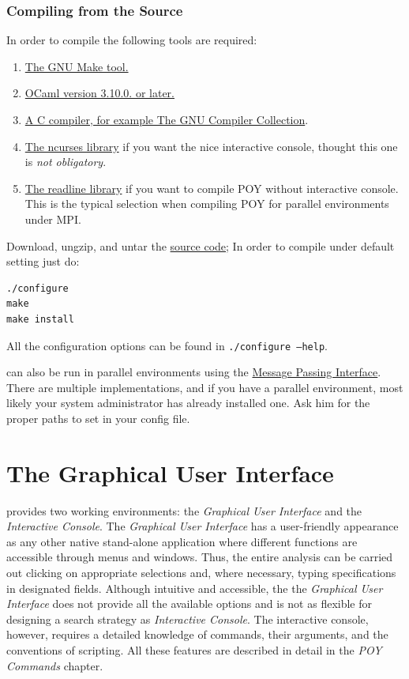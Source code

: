 \subsubsection{Compiling from the Source}

In order to compile \poy the following tools are required:

\begin{enumerate}
    \item \href{http://www.gnu.org/software/make/}{The GNU Make tool.}
    \item \href{http://www.ocaml.org}{OCaml version 3.10.0. or later.}
    \item \href{http://gcc.gnu.org/}{A C compiler, for example The GNU Compiler Collection}.
    \item \href{http://www.gnu.org/software/ncurses/}{The ncurses library} if
        you want the nice interactive console, thought this one is
        \emph{not obligatory}.
    \item \href{http://tiswww.case.edu/php/chet/readline/rltop.html}{The
        readline library} if you want
        to compile POY without interactive console. This is the typical
        selection when compiling POY for parallel environments under MPI.
\end{enumerate}

Download, ungzip, and untar the
\href{http://research.amnh.org/scicomp/projects/poy.php}{\poy source code};
In order to compile under default setting just do:
\begin{verbatim}
./configure
make
make install
\end{verbatim}
All the configuration options can be found in {\tt ./configure --help}.

\poy can also be run in parallel environments using the
\href{http://www-unix.mcs.anl.gov/mpi/}{Message Passing Interface}. There are
multiple implementations, and if you have a parallel environment, most likely
your system administrator has already installed one. Ask him for the proper
paths to set in your config file.

\section{The Graphical User Interface}

\poy provides two working environments: the \emph{Graphical User Interface} and the \emph{Interactive Console}.  The \emph{Graphical User Interface} has a user-friendly appearance as any other native stand-alone application where different functions are accessible through menus and windows. Thus, the entire analysis can be carried out clicking on appropriate selections and, where necessary, typing specifications in designated fields. Although intuitive and accessible, the the \emph{Graphical User Interface} does not provide all the available options and is not as flexible for designing a search strategy as \emph{Interactive Console}. The interactive console, however, requires a detailed knowledge of \poy commands, their arguments, and the conventions of \poy scripting. All these features are described in detail in the \emph{POY Commands} chapter.

